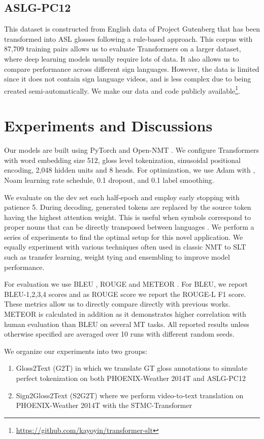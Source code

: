 \documentclass[11pt]{article}
\begin{document}
\subsection*{ASLG-PC12 \cite{asl}}  This dataset is constructed from English data of Project Gutenberg that has been transformed into ASL glosses following a rule-based approach. This corpus with 87,709 training pairs allows us to evaluate Transformers on a larger dataset, where deep learning models usually require lots of data. It also allows us to compare performance across different sign languages. However, the data is limited since it does not contain sign language videos, and is less complex due to being created semi-automatically. We make our data and code publicly available\footnote{\url{https://github.com/kayoyin/transformer-slt}}.



\section{Experiments and Discussions}
Our models are built using PyTorch \cite{pytorch} and Open-NMT \cite{opennmt}. We configure Transformers with word embedding size 512, gloss level tokenization, sinusoidal positional encoding, 2,048 hidden units and 8 heads. For optimization, we use Adam \cite{adam} with , Noam learning rate schedule, 0.1 dropout, and 0.1 label smoothing. 

We evaluate on the dev set each half-epoch and employ early stopping with patience 5. During decoding, generated  tokens are replaced by the source token having the highest attention weight. This is useful when  symbols correspond to proper nouns that can be directly transposed between languages \cite{opennmt}. We perform a series of experiments to find the optimal setup for this novel application. We equally experiment with various techniques often used in classic NMT to SLT such as transfer learning, weight tying and ensembling to improve model performance.

For evaluation we use BLEU \cite{bleu}, ROUGE \cite{rouge} and METEOR \cite{meteor}. For BLEU, we report BLEU-1,2,3,4 scores and as ROUGE score we report the ROUGE-L F1 score. These metrics allow us to directly compare directly with previous works. METEOR is calculated in addition as it demonstrates higher correlation with human evaluation than BLEU on several MT tasks. All reported results unless otherwise specified are averaged over 10 runs with different random seeds.

We organize our experiments into two groups:
\begin{enumerate}
    \item Gloss2Text (G2T) in which we translate GT gloss annotations to simulate perfect tokenization on both PHOENIX-Weather 2014T and ASLG-PC12 
    \item Sign2Gloss2Text (S2G2T) where we perform video-to-text translation on PHOENIX-Weather 2014T with the STMC-Transformer

\end{enumerate}
\end{document}
